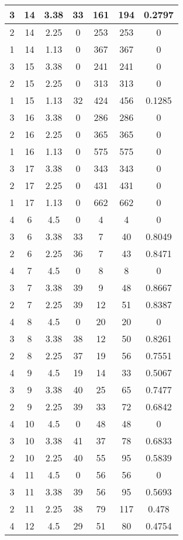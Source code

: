 \documentclass[letterpaper, 12pt]{article}
\begin{document}
\begin{longtable}{|c|c|c|c|c|c|c|}
\hline
3 & 14 & 3.38 & 33 & 161 & 194 & 0.2797 \\
\hline
2 & 14 & 2.25 & 0 & 253 & 253 & 0 \\
\hline
1 & 14 & 1.13 & 0 & 367 & 367 & 0 \\
\hline
3 & 15 & 3.38 & 0 & 241 & 241 & 0 \\
\hline
2 & 15 & 2.25 & 0 & 313 & 313 & 0 \\
\hline
1 & 15 & 1.13 & 32 & 424 & 456 & 0.1285 \\
\hline
3 & 16 & 3.38 & 0 & 286 & 286 & 0 \\
\hline
2 & 16 & 2.25 & 0 & 365 & 365 & 0 \\
\hline
1 & 16 & 1.13 & 0 & 575 & 575 & 0 \\
\hline
3 & 17 & 3.38 & 0 & 343 & 343 & 0 \\
\hline
2 & 17 & 2.25 & 0 & 431 & 431 & 0 \\
\hline
1 & 17 & 1.13 & 0 & 662 & 662 & 0 \\
\hline
4 & 6 & 4.5 & 0 & 4 & 4 & 0 \\
\hline
3 & 6 & 3.38 & 33 & 7 & 40 & 0.8049 \\
\hline
2 & 6 & 2.25 & 36 & 7 & 43 & 0.8471 \\
\hline
4 & 7 & 4.5 & 0 & 8 & 8 & 0 \\
\hline
3 & 7 & 3.38 & 39 & 9 & 48 & 0.8667 \\
\hline
2 & 7 & 2.25 & 39 & 12 & 51 & 0.8387 \\
\hline
4 & 8 & 4.5 & 0 & 20 & 20 & 0 \\
\hline
3 & 8 & 3.38 & 38 & 12 & 50 & 0.8261 \\
\hline
2 & 8 & 2.25 & 37 & 19 & 56 & 0.7551 \\
\hline
4 & 9 & 4.5 & 19 & 14 & 33 & 0.5067 \\
\hline
3 & 9 & 3.38 & 40 & 25 & 65 & 0.7477 \\
\hline
2 & 9 & 2.25 & 39 & 33 & 72 & 0.6842 \\
\hline
4 & 10 & 4.5 & 0 & 48 & 48 & 0 \\
\hline
3 & 10 & 3.38 & 41 & 37 & 78 & 0.6833 \\
\hline
2 & 10 & 2.25 & 40 & 55 & 95 & 0.5839 \\
\hline
4 & 11 & 4.5 & 0 & 56 & 56 & 0 \\
\hline
3 & 11 & 3.38 & 39 & 56 & 95 & 0.5693 \\
\hline
2 & 11 & 2.25 & 38 & 79 & 117 & 0.478 \\
\hline
4 & 12 & 4.5 & 29 & 51 & 80 & 0.4754 \\

\end{longtable}
\end{document}
